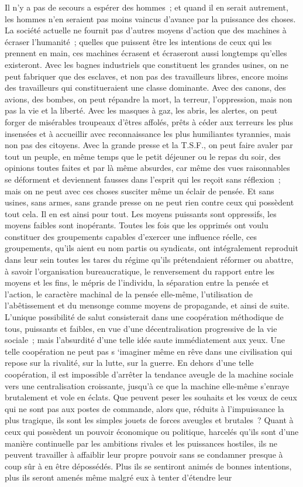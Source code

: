 \documentclass[french,twoside]{book} %
\begin{document}
Il n'y a pas de secours a espérer des hommes ; et quand il en serait autrement, les hommes n'en seraient pas moins vaincus d'avance par la puissance des choses. La société actuelle ne fournit pas d'autres moyens d'action que des machines à écraser l'humanité ; quelles que puissent être les intentions de ceux qui les prennent en main, ces machines écrasent et écraseront aussi longtemps qu'elles existeront. Avec les bagnes industriels que constituent les grandes usines, on ne peut fabriquer que des esclaves, et non pas des travailleurs libres, encore moins des travailleurs qui constitueraient une classe dominante. Avec des canons, des avions, des bombes, on peut répandre la mort, la terreur, l'oppression, mais non pas la vie et la liberté. Avec les masques à gaz, les abris, les alertes, on peut forger de misérables troupeaux d'êtres affolés, prêts à céder aux terreurs les plus insensées et à accueillir avec reconnaissance les plus humiliantes tyrannies, mais non pas des citoyens. Avec la grande presse et la T.S.F., on peut faire avaler par tout un peuple, en même temps que le petit déjeuner ou le repas du soir, des opinions toutes faites et par là même absurdes, car même des vues raisonnables se déforment et deviennent fausses dans l'esprit qui les reçoit sans réflexion ; mais on ne peut avec ces choses susciter même un éclair de pensée. Et sans usines, sans armes, sans grande presse on ne peut rien contre ceux qui possèdent tout cela. Il en est ainsi pour tout. Les moyens puissants sont oppressifs, les moyens faibles sont inopérants. Toutes les fois que les opprimés ont voulu constituer des groupements capables d'exercer une influence réelle, ces groupements, qu'ils aient eu nom partis ou syndicats, ont intégralement reproduit dans leur sein toutes les tares du régime qu'ils prétendaient réformer ou abattre, à savoir l'organisation bureaucratique, le renversement du rapport entre les moyens et les fins, le mépris de l'individu, la séparation entre la pensée et l'action, le caractère machinal de la pensée elle-même, l'utilisation de l'abêtissement et du mensonge comme moyens de propagande, et ainsi de suite. L'unique possibilité de salut consisterait dans une coopération méthodique de tous, puissants et faibles, en vue d'une décentralisation progressive de la vie sociale ; mais l'absurdité d'une telle idée saute immédiatement aux yeux. Une telle coopération ne peut pas s ‘imaginer même en rêve dans une civilisation qui repose sur la rivalité, sur la lutte, sur la guerre. En dehors d'une telle coopération, il est impossible d'arrêter la tendance aveugle de la machine sociale vers une centralisation croissante, jusqu'à ce que la machine elle-même s'enraye brutalement et vole en éclats. Que peuvent peser les souhaits et les vœux de ceux qui ne sont pas aux postes de commande, alors que, réduits à l'impuissance la plus tragique, ils sont les simples jouets de forces aveugles et brutales ? Quant à ceux qui possèdent un pouvoir économique ou politique, harcelés qu'ils sont d'une manière continuelle par les ambitions rivales et les puissances hostiles, ils ne peuvent travailler à affaiblir leur propre pouvoir sans se condamner presque à coup sûr à en être dépossédés. Plus ils se sentiront animés de bonnes intentions, plus ils seront amenés même malgré eux à tenter d'étendre leur 
\end{document}
